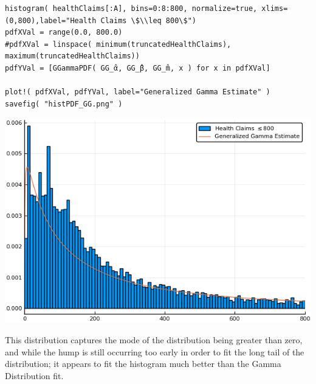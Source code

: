 \documentclass[12pt, letterpaper]{paper}
\begin{document}
\begin{verbatim}
histogram( healthClaims[:A], bins=0:8:800, normalize=true, xlims=(0,800),label="Health Claims \$\\leq 800\$")
pdfXVal = range(0.0, 800.0)
#pdfXVal = linspace( minimum(truncatedHealthClaims), maximum(truncatedHealthClaims))
pdfYVal = [GGammaPDF( GG_̂α, GG_̂β, GG_̂m, x ) for x in pdfXVal]

plot!( pdfXVal, pdfYVal, label="Generalized Gamma Estimate" )
savefig( "histPDF_GG.png" )
\end{verbatim}

\begin{center}
\includegraphics[width=.9\linewidth]{histPDF_GG.png}
\end{center}

This distribution captures the mode of the distribution being greater
than zero, and while the hump is still occurring too early in order to
fit the long tail of the distribution; it appears to fit the histogram
much better than the Gamma Distribution fit.
\end{document}
